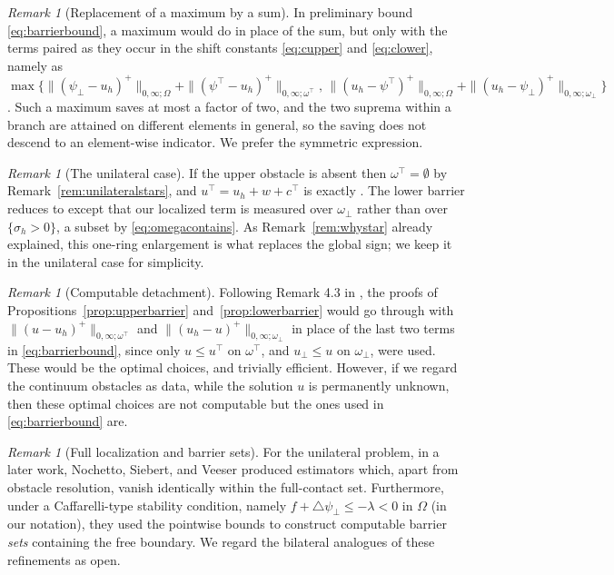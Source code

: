 \documentclass[12pt]{amsart}
\numberwithin{equation}{section}
\theoremstyle{plain}
\theoremstyle{definition}
\theoremstyle{remark}
\newtheorem{remark}[theorem]{Remark}
\newcommand{\Om}{\Omega}
\newcommand{\psilo}{\psi_\bot}
\newcommand{\psiup}{\psi^\top}
\newcommand{\ombot}{\omega_\bot}
\newcommand{\omtop}{\omega^\top}
\begin{document}
\begin{remark}[Replacement of a maximum by a sum]
\label{rem:maxreplace}
In preliminary bound \eqref{eq:barrierbound}, a maximum would do in place of the sum, but only with the terms paired as they occur in the shift constants \eqref{eq:cupper} and \eqref{eq:clower}, namely as $\max\{\|(\psilo-u_h)^+\|_{0,\infty;\Om} + \|(\psiup-u_h)^+\|_{0,\infty;\omtop},\,\|(u_h-\psiup)^+\|_{0,\infty;\Om} + \|(u_h-\psilo)^+\|_{0,\infty;\ombot}\}$.  Such a maximum saves at most a factor of two, and the two suprema within a branch are attained on different elements in general, so the saving does not descend to an element-wise indicator.  We prefer the symmetric expression.
\end{remark}

\begin{remark}[The unilateral case]
\label{rem:unilateral}
If the upper obstacle is absent then $\omtop = \emptyset$ by Remark~\ref{rem:unilateralstars}, and $u^\top = u_h + w + c^\top$ is exactly \cite[formula (4.2)]{NSV03}.  The lower barrier reduces to \cite[formula (4.6)]{NSV03} except that our localized term is measured over $\ombot$ rather than over $\{\sigma_h>0\}$, a subset by \eqref{eq:omegacontains}.  As Remark~\ref{rem:whystar} already explained, this one-ring enlargement is what replaces the global sign; we keep it in the unilateral case for simplicity.
\end{remark}

\begin{remark}[Computable detachment]
\label{rem:computabledetach}
Following Remark 4.3 in \cite{NSV03}, the proofs of Propositions~\ref{prop:upperbarrier} and~\ref{prop:lowerbarrier} would go through with $\|(u-u_h)^+\|_{0,\infty;\omtop}$ and $\|(u_h-u)^+\|_{0,\infty;\ombot}$ in place of the last two terms in \eqref{eq:barrierbound}, since only $u \le u^\top$ on $\omtop$, and $u_\bot \le u$ on $\ombot$, were used.  These would be the optimal choices, and trivially efficient.  However, if we regard the continuum obstacles as data, while the solution $u$ is permanently unknown, then these optimal choices are not computable but the ones used in \eqref{eq:barrierbound} are.
\end{remark}

\begin{remark}[Full localization and barrier sets]
\label{rem:localization}
For the unilateral problem, in a later work, Nochetto, Siebert, and Veeser \cite{NSV05} produced estimators which, apart from obstacle resolution, vanish identically within the full-contact set.  Furthermore, under a Caffarelli-type stability condition, namely $f + \triangle \psilo \le -\lambda<0$ in $\Om$ (in our notation), they used the pointwise bounds to construct computable barrier \emph{sets} containing the free boundary.  We regard the bilateral analogues of these refinements as open.
\end{remark}
\end{document}
